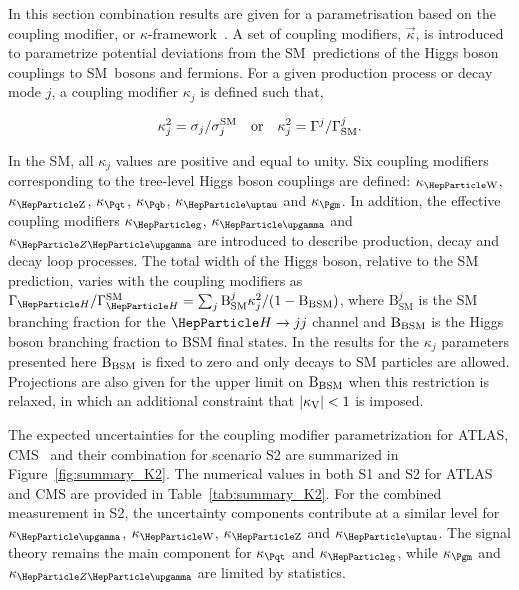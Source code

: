 
In this section combination results are given for a parametrisation based on the coupling modifier, or $\kappa$-framework~\cite{Heinemeyer:2013tqa}. A set of coupling modifiers, $\vec\kappa$, is introduced to parametrize potential deviations from the SM~predictions of the Higgs boson couplings to SM~bosons and fermions. For a given production process or decay mode $j$, a coupling modifier $\kappa_j$ is defined such that,

\begin{equation}
\label{eq:kappa}
  \kappa_j^2=\sigma_j/\sigma_j^\SM\ \ \ {\rm or}\ \ \  \kappa_j^2=\Gamma^j/\Gamma^j_\SM.
\end{equation}

In the SM, all $\kappa_j$ values are positive and equal to unity. Six coupling modifiers corresponding to the tree-level Higgs boson couplings are defined: $\kW$, $\kZ$, $\ktop$, $\kb$, $\ktau$ and $\kmu$. In addition, the effective coupling modifiers $\kglu$, $\kgam$ and $\kzgam$ are introduced to describe \ggh production, \hgg decay and \hzg decay loop processes. 
The total width of the Higgs boson, relative to the SM prediction, varies with the coupling modifiers as $\GammaSM = \sum_{j}\mathrm{B}^{j}_{\text{SM}}\kappa_{j}^{2} / (1 - \Bbsm)$, where $\mathrm{B}^{j}_{\text{SM}}$ is the SM branching fraction for the $\PH\rightarrow jj$ channel and $\mathrm{B_{BSM}}$ is the Higgs boson branching fraction to BSM final states. In the results for the $\kappa_j$ parameters presented here $\mathrm{B_{BSM}}$ is fixed to zero and only decays to SM particles are allowed. Projections are also given for the upper limit on $\mathrm{B_{BSM}}$ when this restriction is relaxed, in which an additional constraint that $|\kappa_{\mathrm{V}}| < 1$ is imposed. 

The expected uncertainties for the coupling modifier parametrization for ATLAS, CMS~\cite{ATL-PHYS-PUB-2018-054,CMS-PAS-FTR-18-011} and their combination for scenario S2 are summarized in Figure~\ref{fig:summary_K2}. The numerical values in both S1 and S2 for ATLAS and CMS are provided in Table~\ref{tab:summary_K2}.
For the combined measurement in S2, the uncertainty components  contribute at a similar level for $\kgam$, $\kW$, $\kZ$ and $\ktau$. The signal theory remains the main component for $\ktop$ and $\kglu$, while $\kmu$ and $\kzgam$ are limited by statistics.

